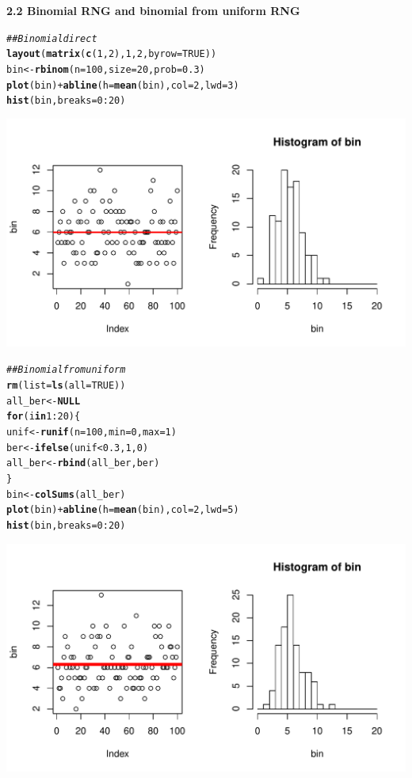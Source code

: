 \documentclass{article}\usepackage[]{graphicx}\usepackage[]{color}
\makeatletter
\newcommand{\hlnum}[1]{\textcolor[rgb]{0.686,0.059,0.569}{#1}}%
\newcommand{\hlcom}[1]{\textcolor[rgb]{0.678,0.584,0.686}{\textit{#1}}}%
\newcommand{\hlopt}[1]{\textcolor[rgb]{0,0,0}{#1}}%
\newcommand{\hlstd}[1]{\textcolor[rgb]{0.345,0.345,0.345}{#1}}%
\newcommand{\hlkwa}[1]{\textcolor[rgb]{0.161,0.373,0.58}{\textbf{#1}}}%
\newcommand{\hlkwb}[1]{\textcolor[rgb]{0.69,0.353,0.396}{#1}}%
\newcommand{\hlkwc}[1]{\textcolor[rgb]{0.333,0.667,0.333}{#1}}%
\newcommand{\hlkwd}[1]{\textcolor[rgb]{0.737,0.353,0.396}{\textbf{#1}}}%
\newenvironment{kframe}{%
 \def\at@end@of@kframe{}%
 \ifinner\ifhmode%
  \def\at@end@of@kframe{\end{minipage}}%
  \begin{minipage}{\columnwidth}%
 \fi\fi%
 \def\FrameCommand##1{\hskip\@totalleftmargin \hskip-\fboxsep
 \colorbox{shadecolor}{##1}\hskip-\fboxsep
     \hskip-\linewidth \hskip-\@totalleftmargin \hskip\columnwidth}%
 \MakeFramed {\advance\hsize-\width
   \@totalleftmargin\z@ \linewidth\hsize
   \@setminipage}}%
 {\par\unskip\endMakeFramed%
 \at@end@of@kframe}
\newenvironment{knitrout}{}{} %
\makeatother
\begin{document}
\pagebreak
\bf{2.2 Binomial RNG and binomial from uniform RNG}
\begin{knitrout}
\color{fgcolor}\begin{kframe}
\begin{alltt}
\hlcom{## Binomial direct}
\hlkwd{layout}\hlstd{(}\hlkwd{matrix}\hlstd{(}\hlkwd{c}\hlstd{(}\hlnum{1}\hlstd{,} \hlnum{2}\hlstd{),} \hlnum{1}\hlstd{,} \hlnum{2}\hlstd{,} \hlkwc{byrow} \hlstd{=} \hlnum{TRUE}\hlstd{))}
\hlstd{bin} \hlkwb{<-} \hlkwd{rbinom}\hlstd{(}\hlkwc{n} \hlstd{=} \hlnum{100}\hlstd{,} \hlkwc{size} \hlstd{=} \hlnum{20}\hlstd{,} \hlkwc{prob} \hlstd{=} \hlnum{0.3}\hlstd{)}
\hlkwd{plot}\hlstd{(bin)} \hlopt{+} \hlkwd{abline}\hlstd{(}\hlkwc{h} \hlstd{=} \hlkwd{mean}\hlstd{(bin),} \hlkwc{col} \hlstd{=} \hlnum{2}\hlstd{,} \hlkwc{lwd} \hlstd{=} \hlnum{3}\hlstd{)}
\hlkwd{hist}\hlstd{(bin,} \hlkwc{breaks} \hlstd{=} \hlnum{0}\hlopt{:}\hlnum{20}\hlstd{)}
\end{alltt}
\end{kframe}
\includegraphics[width=.5\linewidth]{figure/bin1} 
\begin{kframe}\begin{alltt}
\hlcom{## Binomial from uniform}
\hlkwd{rm}\hlstd{(}\hlkwc{list} \hlstd{=} \hlkwd{ls}\hlstd{(}\hlkwc{all} \hlstd{=} \hlnum{TRUE}\hlstd{))}
\hlstd{all_ber} \hlkwb{<-} \hlkwa{NULL}
\hlkwa{for} \hlstd{(i} \hlkwa{in} \hlnum{1}\hlopt{:}\hlnum{20}\hlstd{) \{}
    \hlstd{unif} \hlkwb{<-} \hlkwd{runif}\hlstd{(}\hlkwc{n} \hlstd{=} \hlnum{100}\hlstd{,} \hlkwc{min} \hlstd{=} \hlnum{0}\hlstd{,} \hlkwc{max} \hlstd{=} \hlnum{1}\hlstd{)}
    \hlstd{ber} \hlkwb{<-} \hlkwd{ifelse}\hlstd{(unif} \hlopt{<} \hlnum{0.3}\hlstd{,} \hlnum{1}\hlstd{,} \hlnum{0}\hlstd{)}
    \hlstd{all_ber} \hlkwb{<-} \hlkwd{rbind}\hlstd{(all_ber, ber)}
\hlstd{\}}
\hlstd{bin} \hlkwb{<-} \hlkwd{colSums}\hlstd{(all_ber)}
\hlkwd{plot}\hlstd{(bin)} \hlopt{+} \hlkwd{abline}\hlstd{(}\hlkwc{h} \hlstd{=} \hlkwd{mean}\hlstd{(bin),} \hlkwc{col} \hlstd{=} \hlnum{2}\hlstd{,} \hlkwc{lwd} \hlstd{=} \hlnum{5}\hlstd{)}
\hlkwd{hist}\hlstd{(bin,} \hlkwc{breaks} \hlstd{=} \hlnum{0}\hlopt{:}\hlnum{20}\hlstd{)}
\end{alltt}
\end{kframe}
\includegraphics[width=.5\linewidth]{figure/bin2} 

\end{knitrout}
\end{document}
